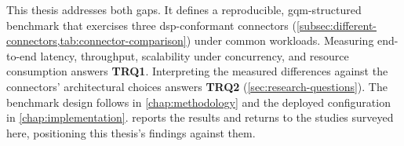 This thesis addresses both gaps. It defines a reproducible, \gls{gqm}-structured benchmark that exercises three \gls{dsp}-conformant connectors (\cref{subsec:different-connectors,tab:connector-comparison}) under common workloads. Measuring end-to-end latency, throughput, scalability under concurrency, and resource consumption answers \textbf{TRQ1}. Interpreting the measured differences against the connectors' architectural choices answers \textbf{TRQ2} (\cref{sec:research-questions}). The benchmark design follows in \cref{chap:methodology} and the deployed configuration in \cref{chap:implementation}.  reports the results and returns to the studies surveyed here, positioning this thesis's findings against them.
